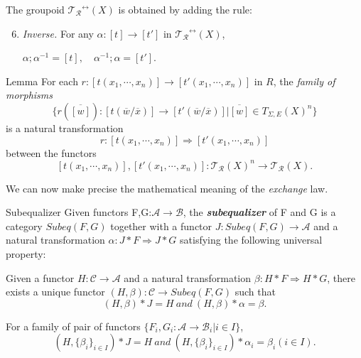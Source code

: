 \documentclass{beamer}
\begin{document}
\begin{frame}
    
    The groupoid $\mathcal{T_R}^{\leftrightarrow}(X)$ is obtained by adding the rule:
    \begin{enumerate}
        \setcounter{enumi}{5}
        \item  \emph{Inverse.} For any $\alpha:[t] \rightarrow [t']$ in $\mathcal{T_R}^{\leftrightarrow}(X)$, 
    
        $ \alpha;\alpha^{-1} = [t],\quad \alpha^{-1};\alpha= [t'].$
    \end{enumerate}
    \pause
    \begin{block}{Lemma}
        For each $ r:[t(x_1,\cdots,x_n)] \rightarrow [t'(x_1,\cdots,x_n)]$ in $R$, the \emph{family of morphisms}
        $$ \{r(\overline{[w]}): [t(\overline{w}/\overline{x})] \rightarrow [t'(\overline{w}/\overline{x})] | \overline{[w]} \in T_{\Sigma,E}(X)^n\}$$
        is a natural transformation
        $$ r:[t(x_1,\cdots,x_n)] \Rightarrow [t'(x_1,\cdots,x_n)]$$
        between the functors 
        $$[t(x_1,\cdots,x_n)],[t'(x_1,\cdots,x_n)]: \mathcal{T_R}(X)^n \rightarrow \mathcal{T_R}(X).$$

    \end{block}
\end{frame}
\begin{frame}
    We can now make precise the mathematical meaning of the \emph{exchange} law.
    
    \pause 
    \begin{block}{Subequalizer}
        Given functors F,G:$\mathcal{A} \rightarrow \mathcal{B}$, the \textbf{\emph{subequalizer}} of F and G is a 
        category $Subeq(F,G)$ together with a functor $J:Subeq(F,G) \rightarrow \mathcal{A}$ and a natural transformation 
        $\alpha: J *  F \Rightarrow J * G$ satisfying the following universal property:

        \bigskip
        Given a functor $H:\mathcal{C} \rightarrow \mathcal{A}$ and  a natural transformation $\beta:H*F \Rightarrow H*G$, there exists a unique functor 
        $ (H,\beta):\mathcal{C} \rightarrow Subeq(F,G)$ such that 
        $$ (H,\beta) * J = H\ and\ (H,\beta)*\alpha = \beta.$$ 

        For a family of pair of functors $\{F_i,G_i:\mathcal{A} \rightarrow \mathcal{B}_i | i \in I\}$,
        $$ (H,\{\beta_i\}_{i \in I}) * J = H\ and\ (H,\{\beta_i\}_{i \in I})*\alpha_i = \beta_i (i \in I).$$ 
    \end{block}
    

\end{frame}
\end{document}
